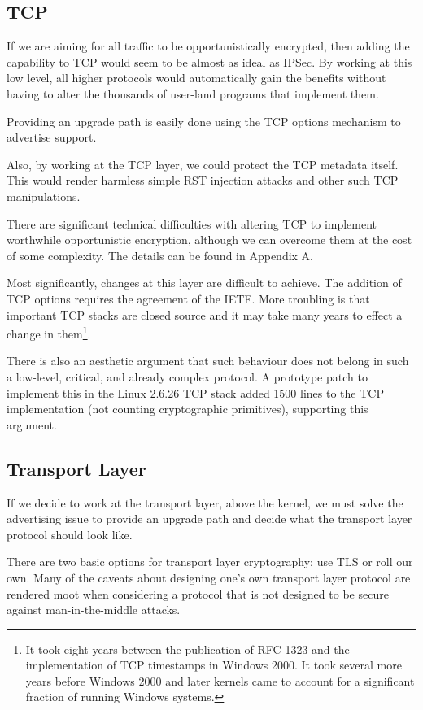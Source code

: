 \documentclass[conference]{IEEEtran}
\begin{document}
\subsection{TCP}

If we are aiming for all traffic to be opportunistically encrypted, then adding
the capability to TCP would seem to be almost as ideal as IPSec. By working at
this low level, all higher protocols would automatically gain the benefits
without having to alter the thousands of user-land programs that implement
them.

Providing an upgrade path is easily done using the TCP options mechanism to
advertise support.

Also, by working at the TCP layer, we could protect the TCP metadata
itself. This would render harmless simple RST injection attacks\cite{comcast}
and other such TCP manipulations.

There are significant technical difficulties with altering TCP to implement
worthwhile opportunistic encryption, although we can overcome them at the cost
of some complexity. The details can be found in Appendix A.

Most significantly, changes at this layer are difficult to achieve. The
addition of TCP options requires the agreement of the IETF.
More troubling is that important TCP stacks are closed source and it may take
many years to effect a change in them\footnote{It took eight years between the
publication of RFC 1323 and the implementation of TCP timestamps in Windows
2000. It took several more years before Windows 2000 and later kernels came to
account for a significant fraction of running Windows systems.}.

There is also an aesthetic argument that such behaviour does not belong in such
a low-level, critical, and already complex protocol. A prototype patch to
implement this in the Linux 2.6.26 TCP stack added 1500 lines to the TCP
implementation (not counting cryptographic primitives), supporting this
argument.

\subsection{Transport Layer}

If we decide to work at the transport layer, above the kernel, we must
solve the advertising issue to provide an upgrade path and decide what the
transport layer protocol should look like.

There are two basic options for transport layer cryptography: use
TLS or roll our own. Many of the caveats about designing one's own transport
layer protocol are rendered moot when considering a protocol that is not
designed to be secure against man-in-the-middle attacks.
\end{document}
